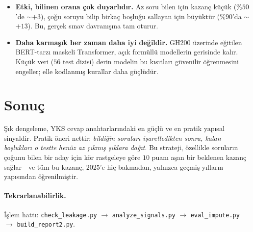 \documentclass[11pt]{article}
\begin{document}
\begin{itemize}
  aralığında \textsc{SmartHybrid} (dengeleme + pencere-kaçınma) lider
  ($+3.66$ / $+6.33$); $\%85$--$\%90$'da saf \textsc{Hybrid}/\textsc{Unified}
  öne geçer ($+10$ ila $+13$). Çoğu gerçek aday $\%50$--$\%80$ aralığında
  olduğundan, pratikte \textsc{SmartHybrid} en faydalı modeldir.
  \item \textbf{Etki, bilinen orana çok duyarlıdır.} Az soru bilen için kazanç
  küçük ($\%50$'de $\sim$$+3$), çoğu soruyu bilip birkaç boşluğu sallayan için
  büyüktür ($\%90$'da $\sim$$+13$). Bu, gerçek sınav davranışına tam oturur.
  \item \textbf{Daha karmaşık her zaman daha iyi değildir.} GH200 üzerinde
  eğitilen BERT-tarzı maskeli Transformer, açık formüllü modellerin gerisinde
  kalır. Küçük veri ($56$ test dizisi) derin modelin bu kısıtları güvenilir
  öğrenmesini engeller; elle kodlanmış kurallar daha güçlüdür.
\end{itemize}

\section{Sonuç}
Şık dengeleme, YKS cevap anahtarlarındaki en güçlü ve en pratik yapısal
sinyaldir. Pratik öneri nettir: \emph{bildiğin soruları işaretledikten
sonra, kalan boşlukları o testte henüz az çıkmış şıklara dağıt}. Bu strateji,
özellikle soruların çoğunu bilen bir aday için kör rastgeleye göre $10$
puanı aşan bir beklenen kazanç sağlar---ve tüm bu kazanç, 2025'e hiç
bakmadan, yalnızca geçmiş yılların yapısından öğrenilmiştir.

\paragraph{Tekrarlanabilirlik.} İşlem hattı: \texttt{check\_leakage.py}
$\rightarrow$ \texttt{analyze\_signals.py} $\rightarrow$
\texttt{eval\_impute.py} $\rightarrow$ \texttt{build\_report2.py}.
\end{document}
